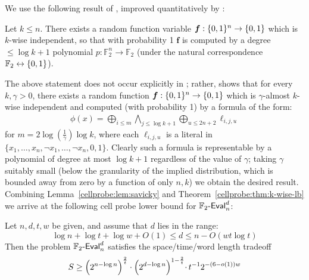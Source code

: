 We use the following result of \cite{razborov-ramsey}, improved quantitatively by \cite{savicky1995improved}:
\begin{lemma}\label{cellprobe:lem:savicky}
Let $k \leq n$. There exists a random function variable $\bm{f}: \{0,1\}^n \to \{0,1\}$ which is $k$-wise independent, so that with probability 1 $\bm{f}$ is computed by a degree $\leq \log k+1$ polynomial $p: \mathbb{F}_2^n \to \mathbb{F}_2$ (under the natural correspondence $\mathbb{F}_2 \leftrightarrow \{0,1\}$).
\end{lemma}
The above statement does not occur explicitly in \cite{razborov-ramsey,savicky1995improved}; rather, \cite{savicky1995improved} shows that for every $k, \gamma >0$, there exists a random function $\bm{f}: \{0,1\}^n \to \{0,1\}$ which is $\gamma$-almost $k$-wise independent and computed (with probability 1) by a formula of the form:
\begin{gather}
\phi(x) = \mathop{\bigoplus}\limits_{i\leq m}\mathop{\bigwedge}\limits_{j \leq \log k + 1}  \mathop{\bigoplus}\limits_{u \leq 2n+2} \ell_{i,j,u} \label{cellprobe:eq:savicky}
\end{gather}
for $m= 2\log(\frac{1}{\gamma})\log k$, where each $\ell_{i,j,u}$ is a literal in $\{x_1,\ldots,x_n, \lnot x_1,\ldots,\lnot x_n,0,1\}$. Clearly such a formula is representable by a polynomial of degree at most $\log k+1$ regardless of the value of $\gamma$; taking $\gamma$ suitably small (below the granularity of the implied distribution, which is bounded away from zero by a function of only $n,k$) we obtain the desired result.
Combining Lemma~\ref{cellprobe:lem:savicky} and Theorem~\ref{cellprobe:thm:k-wise-lb} we arrive at the following cell probe lower bound for $\mathbb{F}_2\text{-}\mathsf{Eval}_n^d$:
\begin{theorem}
Let $n,d,t,w$ be given, and assume that $d$ lies in the range:
\[
 \log n  + \log t +\log w +  O(1) \leq d \leq n - O(wt\log t)
\]
Then the problem $\mathbb{F}_2\text{-}\mathsf{Eval}_n^d$ satisfies the space/time/word length tradeoff
    \[
S \geq \Bigl(2^{n-\log n}\Bigr)^{\frac{2}{t}} \cdot \Bigl(2^{d  - \log n}\Bigl)^{1 - \frac{2}{t}}  \cdot\,t^{-1}2^{-(6-o(1))w }
\]
\end{theorem}

